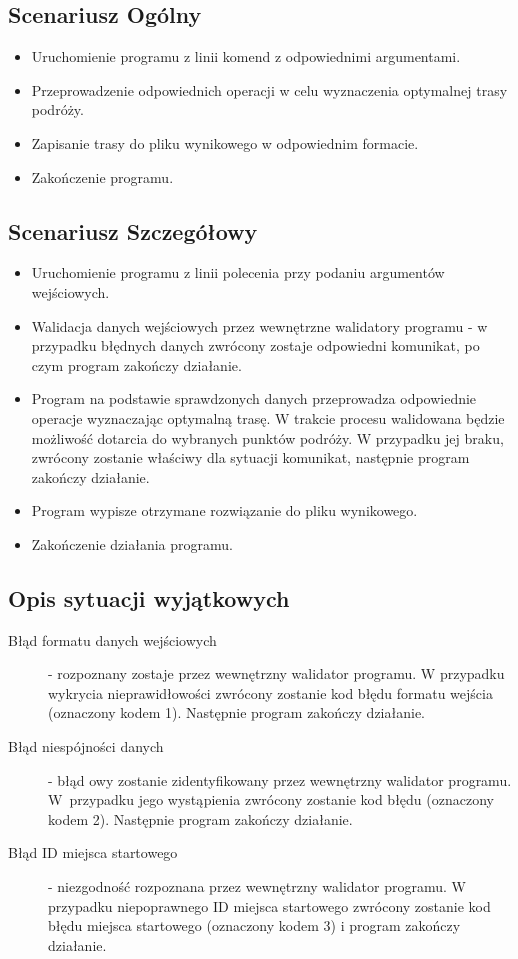 \documentclass[10pt,oneside]{article}
\begin{document}
\subsection{Scenariusz Ogólny}
\begin{itemize}
	\item Uruchomienie programu z linii komend z odpowiednimi argumentami.
	\item Przeprowadzenie odpowiednich operacji w celu wyznaczenia optymalnej trasy podróży.
	\item Zapisanie trasy do pliku wynikowego w odpowiednim formacie.
	\item Zakończenie programu.
\end{itemize}

\subsection{Scenariusz Szczegółowy}
\begin{itemize}
	\item Uruchomienie programu z linii polecenia przy podaniu argumentów wejściowych.
	\item Walidacja danych wejściowych przez wewnętrzne walidatory programu - w przypadku błędnych danych zwrócony zostaje odpowiedni komunikat, po czym program zakończy działanie.
	\item Program na podstawie sprawdzonych danych przeprowadza odpowiednie operacje wyznaczając optymalną trasę. W trakcie procesu walidowana będzie możliwość dotarcia do wybranych punktów podróży. W przypadku jej braku, zwrócony zostanie właściwy dla sytuacji komunikat, następnie program zakończy działanie.
	\item Program wypisze otrzymane rozwiązanie do pliku wynikowego.
	\item Zakończenie działania programu.
\end{itemize}

\subsection{Opis sytuacji wyjątkowych}
\begin{description}
	\item[Błąd formatu danych wejściowych] - rozpoznany zostaje przez wewnętrzny walidator programu. W przypadku wykrycia nieprawidłowości zwrócony zostanie kod błędu formatu wejścia (oznaczony kodem 1). Następnie program zakończy działanie.
	\item[Błąd niespójności danych] - błąd owy zostanie zidentyfikowany przez wewnętrzny walidator programu. W~przypadku jego wystąpienia zwrócony zostanie kod błędu (oznaczony kodem 2). Następnie program zakończy działanie.
	\item[Błąd ID miejsca startowego] - niezgodność rozpoznana przez wewnętrzny walidator programu. W przypadku niepoprawnego ID miejsca startowego zwrócony zostanie kod błędu miejsca startowego (oznaczony kodem 3) i program zakończy działanie. 
\end{description}
\end{document}
